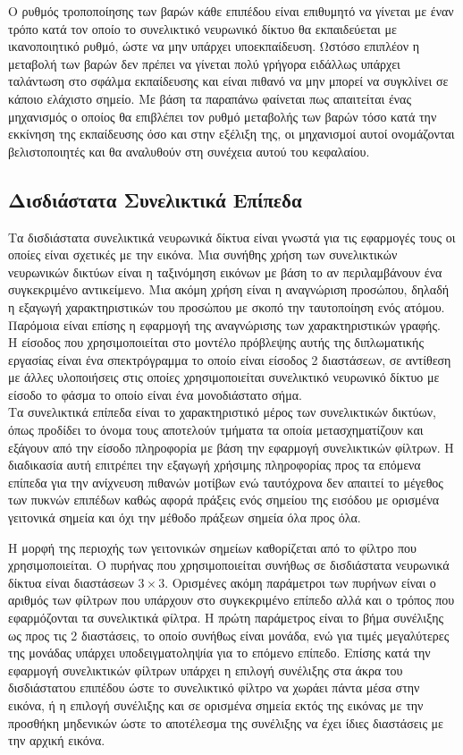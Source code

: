 Ο ρυθμός τροποποίησης των βαρών κάθε επιπέδου είναι επιθυμητό να γίνεται με έναν τρόπο κατά τον οποίο το συνελικτικό νευρωνικό δίκτυο θα εκπαιδεύεται με ικανοποιητικό ρυθμό, ώστε να μην υπάρχει υποεκπαίδευση. Ωστόσο επιπλέον η μεταβολή των βαρών δεν πρέπει να γίνεται πολύ γρήγορα ειδάλλως υπάρχει ταλάντωση στο σφάλμα εκπαίδευσης και είναι πιθανό να μην μπορεί να συγκλίνει σε κάποιο ελάχιστο σημείο. Με βάση τα παραπάνω φαίνεται πως απαιτείται ένας μηχανισμός ο οποίος θα επιβλέπει τον ρυθμό μεταβολής των βαρών τόσο κατά την εκκίνηση της εκπαίδευσης όσο και στην εξέλιξη της, οι μηχανισμοί αυτοί ονομάζονται βελιστοποιητές  και θα αναλυθούν στη συνέχεια αυτού του κεφαλαίου.

\subsection{Δισδιάστατα Συνελικτικά Επίπεδα}
Τα δισδιάστατα συνελικτικά νευρωνικά δίκτυα είναι γνωστά για τις εφαρμογές τους οι οποίες είναι σχετικές με την εικόνα. Μια συνήθης χρήση των συνελικτικών νευρωνικών δικτύων είναι η ταξινόμηση εικόνων με βάση το αν περιλαμβάνουν ένα συγκεκριμένο αντικείμενο. Μια ακόμη χρήση είναι η αναγνώριση προσώπου, δηλαδή η εξαγωγή χαρακτηριστικών του προσώπου με σκοπό την ταυτοποίηση ενός ατόμου. Παρόμοια είναι επίσης η εφαρμογή της αναγνώρισης των χαρακτηριστικών γραφής.\\

Η είσοδος που χρησιμοποιείται στο μοντέλο πρόβλεψης αυτής της διπλωματικής εργασίας είναι ένα σπεκτρόγραμμα το οποίο είναι είσοδος 2 διαστάσεων, σε αντίθεση με άλλες υλοποιήσεις στις οποίες χρησιμοποιείται συνελικτικό νευρωνικό δίκτυο με είσοδο το φάσμα το οποίο είναι ένα μονοδιάστατο σήμα.\\

Τα συνελικτικά επίπεδα είναι το χαρακτηριστικό μέρος των συνελικτικών δικτύων, όπως προδίδει το όνομα τους αποτελούν τμήματα τα οποία μετασχηματίζουν και εξάγουν από την είσοδο πληροφορία με βάση την εφαρμογή συνελικτικών φίλτρων. Η διαδικασία αυτή επιτρέπει την εξαγωγή χρήσιμης πληροφορίας προς τα επόμενα επίπεδα για την ανίχνευση πιθανών μοτίβων ενώ ταυτόχρονα δεν απαιτεί το μέγεθος των πυκνών  επιπέδων καθώς αφορά πράξεις ενός σημείου της εισόδου με ορισμένα γειτονικά σημεία και όχι την μέθοδο πράξεων σημεία όλα προς όλα.

Η μορφή της περιοχής των γειτονικών σημείων καθορίζεται από το φίλτρο  που χρησιμοποιείται. Ο πυρήνας που χρησιμοποιείται συνήθως σε δισδιάστατα νευρωνικά δίκτυα είναι διαστάσεων $3\times3$. Ορισμένες ακόμη παράμετροι των πυρήνων είναι ο αριθμός των φίλτρων που υπάρχουν στο συγκεκριμένο επίπεδο αλλά και ο τρόπος που εφαρμόζονται τα συνελικτικά φίλτρα. Η πρώτη παράμετρος είναι το βήμα συνέλιξης ως προς τις 2 διαστάσεις, το οποίο συνήθως είναι μονάδα, ενώ για τιμές μεγαλύτερες της μονάδας υπάρχει υποδειγματοληψία για το επόμενο επίπεδο. Επίσης κατά την εφαρμογή συνελικτικών φίλτρων υπάρχει η επιλογή συνέλιξης στα άκρα του δισδιάστατου επιπέδου ώστε το συνελικτικό φίλτρο να χωράει πάντα μέσα στην εικόνα, ή η επιλογή συνέλιξης και σε ορισμένα σημεία εκτός της εικόνας με την προσθήκη μηδενικών ώστε το αποτέλεσμα της συνέλιξης να έχει ίδιες διαστάσεις με την αρχική εικόνα.

